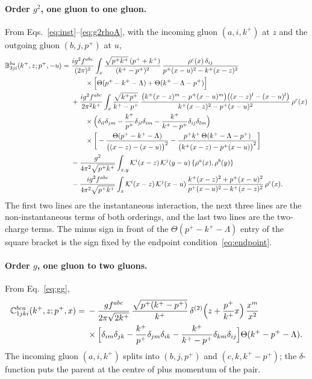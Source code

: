 \paragraph*{Order $g^2$, one gluon to one gluon.} From Eqs.~\eqref{eq:inst}--\eqref{eq:g2rhoA}, with the incoming gluon $(a,i,k^+)$ at $z$ and the outgoing gluon $(b,j,p^+)$ at $u$,
\begin{align}
\mathbb{B}^{ba}_{3ji}(k^+,z;p^+,-u)={}&\frac{ig^2f^{abc}}{(2\pi)^2}\int_x\frac{\sqrt{p^+k^+}\,(p^++k^+)}{(k^+-p^+)^2}\,\frac{\rho^c(x)\,\delta_{ij}}{p^+(x-u)^2-k^+(x-z)^2}\notag\\
&\qquad\times\Big[\Theta(p^+-k^+-\Lambda)+\Theta(k^+-\Lambda-p^+)\Big]\notag\\
&+\frac{ig^2f^{abc}}{2\pi^2k^+}\int_x\frac{\sqrt{k^+p^+}}{k^+-p^+}\,\frac{\big(k^+(x-z)^m-p^+(x-u)^m\big)\big((x-z)^l-(x-u)^l\big)}{k^+(x-z)^2-p^+(x-u)^2}\,\rho^c(x)\notag\\
&\qquad\times\Big(\delta_{il}\delta_{jm}-\frac{k^+}{p^+}\delta_{jl}\delta_{im}-\frac{k^+}{k^+-p^+}\delta_{ij}\delta_{lm}\Big)\notag\\
&\qquad\times\bigg[-\frac{\Theta(p^+-k^+-\Lambda)}{\big((x-z)-(x-u)\big)^2}-\frac{p^+k^+\,\Theta(k^+-\Lambda-p^+)}{\big(k^+(x-z)-p^+(x-u)\big)^2}\bigg]\notag\\
&-\frac{g^2}{4\pi^2\sqrt{p^+k^+}}\int_{x,y}\mathcal{K}^i(x-z)\,\mathcal{K}^j(y-u)\,\{\rho^a(x),\rho^b(y)\}\notag\\
&-\frac{ig^2f^{abc}}{4\pi^2\sqrt{p^+k^+}}\int_x\mathcal{K}^i(x-z)\,\mathcal{K}^j(x-u)\,\frac{k^+(x-z)^2+p^+(x-u)^2}{p^+(x-u)^2-k^+(x-z)^2}\,\rho^c(x).
\label{eq:B3X}
\end{align}
The first two lines are the instantaneous interaction, the next three lines are the non-instantaneous terms of both orderings, and the last two lines are the two-charge terms. The minus sign in front of the $\Theta(p^+-k^+-\Lambda)$ entry of the square bracket is the sign fixed by the endpoint condition~\eqref{eq:endpoint}.

\paragraph*{Order $g$, one gluon to two gluons.} From Eq.~\eqref{eq:gg},
\begin{align}
\mathbb{C}^{bca}_{1jki}(k^+,z;p^+,x)={}&-\frac{gf^{abc}}{2\pi\sqrt{2k^+}}\,\frac{\sqrt{p^+(k^+-p^+)}}{k^+}\,\delta^{(2)}\Big(z+\frac{p^+}{k^+}x\Big)\,\frac{x^m}{x^2}\notag\\
&\times\Big[\delta_{im}\delta_{jk}-\frac{k^+}{p^+}\delta_{jm}\delta_{ik}-\frac{k^+}{k^+-p^+}\delta_{km}\delta_{ij}\Big]\Theta(k^+-p^+-\Lambda).
\label{eq:C1X}
\end{align}
The incoming gluon $(a,i,k^+)$ splits into $(b,j,p^+)$ and $(c,k,k^+-p^+)$; the $\delta$-function puts the parent at the centre of plus momentum of the pair.

